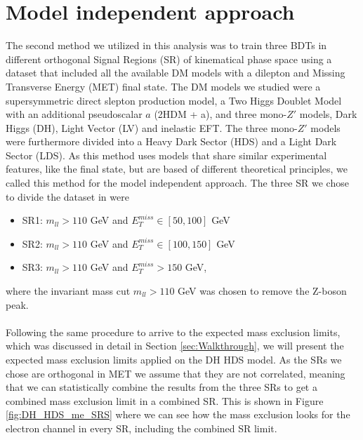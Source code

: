 \documentclass[12pt, a4paper]{book}
\begin{document}
\section{Model independent approach}
The second method we utilized in this analysis was to train three BDTs in different orthogonal Signal Regions (SR) of kinematical phase space using a dataset that included all the available DM models with a dilepton and Missing Transverse Energy (MET) final state. The DM models we studied were a supersymmetric direct slepton production model, a Two Higgs Doublet Model with an additional pseudoscalar $a$ 
(2HDM + a), and three mono-$Z'$ models, Dark Higgs (DH), Light Vector (LV) and inelastic EFT. The three mono-$Z'$ models were furthermore divided into a Heavy Dark Sector (HDS) and a Light Dark Sector (LDS). As this method uses models that share similar experimental features, like the final state, 
but are based of different theoretical principles, we called this method for the model independent approach. The three SR we chose to divide the dataset in were 
\begin{itemize}
   \item SR1: $m_{ll} >110$ GeV and $E_T^{miss} \in [50, 100]$ GeV
   \item SR2: $m_{ll} >110$ GeV and $E_T^{miss} \in [100, 150]$ GeV
   \item SR3: $m_{ll} >110$ GeV and $E_T^{miss} >150$ GeV,
\end{itemize}
where the invariant mass cut $m_{ll}>110$ GeV was chosen to remove the Z-boson peak.\\
\\Following the same procedure to arrive to the expected mass exclusion limits, which was discussed in detail in Section \ref{sec:Walkthrough}, we will present the expected mass exclusion limits applied on the DH HDS model. 
As the SRs we chose are orthogonal in MET we assume that they are not correlated, meaning that we can statistically combine the results from the three SRs to get a combined mass exclusion limit in a combined SR. This is shown in Figure \ref{fig:DH_HDS_me_SRS} where we can see how the mass exclusion looks for
the electron channel in every SR, including the combined SR limit. \\
\end{document}
